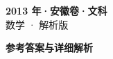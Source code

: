 \documentclass[zihao=-4, a4paper]{ctexart}
\begin{document}
\begin{center}
  {\Large\bfseries 2013 年·安徽卷·文科}\\[4pt]
  {\large 数学 · 解析版}
\end{center}
\medskip
{}

\clearpage
{}
\begin{center}{\Large\bfseries 参考答案与详细解析}\end{center}
\medskip

\end{document}
